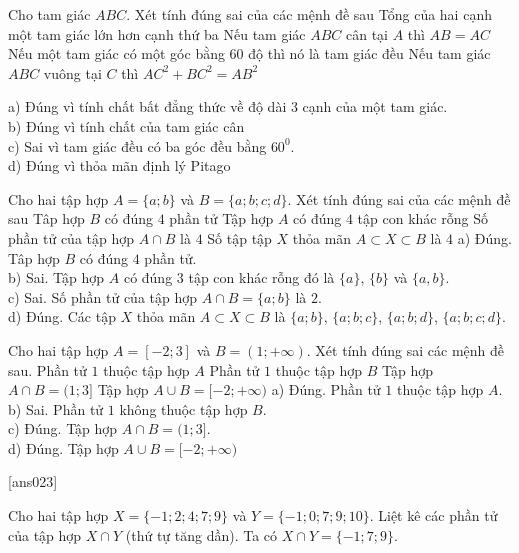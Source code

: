 \begin{ex}
	Cho tam giác $ABC$. Xét tính đúng sai của các mệnh đề sau
	\choiceTF
	{\True Tổng của hai cạnh một tam giác lớn hơn cạnh thứ ba}
	{\True Nếu tam giác $ABC$ cân tại $A$ thì $AB=AC$}
	{Nếu một tam giác có một góc bằng 60 độ thì nó là tam giác đều}
	{\True Nếu tam giác $ABC$ vuông tại $C$ thì $AC^2+BC^2=AB^2$}

	\loigiai
	{
	a) Đúng vì tính chất bất đẳng thức về độ dài 3 cạnh của một tam giác.\\
	b)  Đúng vì tính chất của tam giác cân\\
	c) Sai vì tam giác đều có ba góc đều bằng $60^0$.\\
	d) Đúng vì thỏa mãn định lý Pitago
     	}
\end{ex}

 \begin{ex}
 	Cho hai tập hợp $A=\{a; b\}$ và  $B=\{a;b;c;d\}$. Xét tính đúng sai của các mệnh đề sau
	\choiceTF
 	{\True Tâp hợp $B$ có đúng $4$ phần tử}
 	{Tập hợp $A$ có đúng $4$ tập con khác rỗng}
 	{Số phần tử của tập hợp $A\cap B$ là $4$}
 	{\True Số tập tập $X$ thỏa mãn $A\subset X\subset B$ là $4$}
 	\loigiai
 	{
 	a) Đúng. Tâp hợp $B$ có đúng $4$ phần tử.\\
 	b) Sai. Tập hợp $A$ có đúng $3$ tập con khác rỗng đó là $\{a\}$, $\{b\}$ và $\{a,b\}$.\\
 	c) Sai. Số phần tử của tập hợp $A\cap B=\{a;b\}$ là $2$.\\
 	d) Đúng. Các tập $X$ thỏa mãn $A\subset X\subset B$ là $\{a ; b\}$, $\{a ; b ; c\}$, $\{a ; b ; d\}$, $\{a ; b ; c ; d\}$.
    }
 \end{ex}

 \begin{ex}
 	Cho hai tập hợp $A=[-2;3]$ và $B=(1;+\infty)$. Xét tính đúng sai các mệnh đề sau.
	\choiceTF
 	{\True Phần tử $1$ thuộc tập hợp $A$}
 	{Phần tử $1$ thuộc tập hợp $B$}
 	{\True Tập hợp $A \cap B = (1; 3]$}
 	{\True Tập hợp $A \cup B = [-2; +\infty)$}
 	\loigiai
 	{
 	a) Đúng. Phần tử $1$ thuộc tập hợp $A$.\\
 	b) Sai. Phần tử $1$ không thuộc tập hợp $B$.\\
 	c) Đúng. Tập hợp $A \cap B = (1; 3]$.\\
 	d) Đúng. Tập hợp $A \cup B = [-2; +\infty)$
 	}
 \end{ex}
\TNSA
\setcounter{ex}{0}
[ans023]

\begin{ex}
	Cho hai tập hợp $X=\{-1;2;4;7;9\}$ và $Y=\{-1;0;7;9;10\}$. Liệt kê các phần tử của tập hợp $X\cap Y$ (thứ tự tăng dần).
	\loigiai
	{
	Ta có $X\cap Y=\{-1;7;9\}$.
		}
\end{ex}

